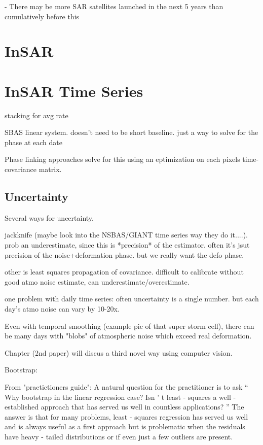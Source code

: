 \documentclass{utexasthesis}
\begin{document}
- There may be more SAR satellites launched in the next 5 years than cumulatively before this

\section{InSAR}

\section{InSAR Time Series}

stacking for avg rate

SBAS linear system. doesn't need to be short baseline. just a way to solve for the phase at each date

Phase linking approaches solve for this using an eptimization on each pixels time-covariance matrix.

\subsection{Uncertainty}

Several ways for uncertainty.

jackknife (maybe look into the NSBAS/GIANT time series way they do it....). prob an underestimate, since this is *precision* of the estimator. often it's jsut precision of the noise+deformation phase. but we really want the defo phase.

other is least squares propagation of covariance. difficult to calibrate without good atmo noise estimate, can underestimate/overestimate.

one problem with daily time series: often uncertainty is a single number. but each day's atmo noise can vary by 10-20x.

Even with temporal smoothing (example pic of that super storm cell), there can be many days with "blobs" of atmospheric noise which exceed real deformation.

Chapter (2nd paper) will discus a third novel way using computer vision.


Bootstrap:

From "practictioners guide":
A natural question for the practitioner is to ask  “ Why bootstrap in the linear regression case? Isn ’ t least - squares a well - established approach that  has  served  us  well  in  countless  applications? ”   The  answer  is  that  for  many  problems, least - squares regression has served us well and is always useful as  a first approach but is problematic when the residuals have heavy - tailed distributions or if even just a few outliers are present.
\end{document}
